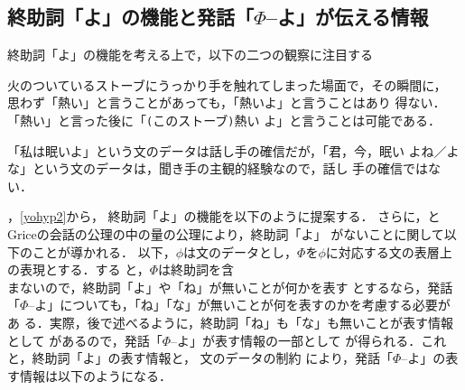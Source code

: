 \subsection{終助詞「よ」の機能と発話「\(\Phi\)--よ」が伝える情報} \label{semyo}
終助詞「よ」の機能を考える上で，以下の二つの観察に注目する
\begin{obserb}\label{yohyp1}
火のついているストーブにうっかり手を触れてしまった場面で，その瞬間に，
思わず「熱い」と言うことがあっても，「熱い{\dg よ}」と言うことはあり
得ない．  「熱い」と言った後に「\verb+(+このストーブ\verb+)+熱い{\dg 
よ}」と言うことは可能である．
\end{obserb}
\begin{obserb}\label{yohyp2}
「私は眠い{\dg よ}」という文のデータは話し手の確信だが，「君，今，眠い
{\dg よね／よな}」という文のデータは，聞き手の主観的経験なので，話し
手の確信ではない．
\end{obserb}
，\ref{yohyp2}から，
終助詞「よ」の機能を以下のように提案する．
さらに，とGriceの会話の公理の中の量の公理により，終助詞「よ」
がないことに関して以下のことが導かれる．
以下，\(\phi\)\hspace{-0.1mm}は文のデータとし，\(\Phi\)\hspace{-0.2mm}を\hspace{-0.2mm}\(\phi\)に対応する文の表層上の表現とする．する
と，\(\Phi\)\hspace{-0.1mm}は終助詞を含\\まないので，終助詞「よ」や「ね」が無いことが何かを表す
とするなら，発話「\(\Phi\)--よ」についても，「ね」「な」が無いことが何を表すのかを考慮する必要があ
る．実際，後で述べるように，終助詞「ね」も「な」も無いことが表す情報として
があるので，発話「\(\Phi\)--よ」が表す情報の一部として
が得られる．これと，終助詞「よ」の表す情報と，
文のデータの制約
により，発話「\(\Phi\)--よ」の表す情報は以下のようになる．
